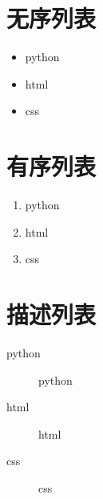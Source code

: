 \documentclass[UTF8]{ctexart}
\begin{document}
\section{无序列表}
\begin{itemize}
  \item python
  \item html
  \item css
\end{itemize}
\section{有序列表}
\begin{enumerate}
  \item python
  \item html
  \item css
\end{enumerate}
\section{描述列表}
\begin{description}
  \item[python] python
  \item[html] html
  \item[css] css
\end{description}
\end{document}

